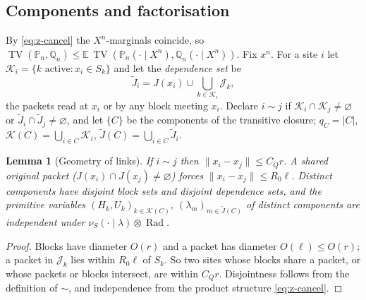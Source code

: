 \documentclass[11pt]{article}
\newtheorem{lemma}[lemma]{Lemma}
\DeclareMathOperator{\Rad}{Rad}
\DeclareMathOperator{\TV}{TV}
\newcommand{\E}{\mathbb{E}}
\newcommand{\PP}{\mathbb{P}}
\newcommand{\cK}{\mathcal{K}}
\newcommand{\cJ}{\mathcal{J}}
\newcommand{\norm}[1]{\lVert #1\rVert}
\newcommand{\abs}[1]{\lvert #1\rvert}
\begin{document}
\subsection{Components and factorisation}
By \eqref{eq:z-cancel} the \(X^n\)-marginals coincide, so
\(\TV(\PP_n,\mathbb Q_n)\le\E\,\TV(\PP_n(\cdot\mid X^n),\mathbb Q_n(\cdot\mid X^n))\).
Fix \(x^n\).  For a site \(i\) let \(\cK_i=\{k\text{ active}:x_i\in S_k\}\)
and let the \emph{dependence set} be
\[
 \widetilde J_i=J(x_i)\cup\bigcup_{k\in\cK_i}\cJ_k ,
\]
the packets read at \(x_i\) or by any block meeting \(x_i\).  Declare
\(i\sim j\) if \(\cK_i\cap\cK_j\ne\varnothing\) or
\(\widetilde J_i\cap\widetilde J_j\ne\varnothing\), and let \(\{C\}\) be
the components of the transitive closure; \(q_C=\abs C\),
\(\cK(C)=\bigcup_{i\in C}\cK_i\), \(\widetilde J(C)=\bigcup_{i\in C}\widetilde J_i\).

\begin{lemma}[Geometry of links]\label{C:lem:links}
If \(i\sim j\) then \(\norm{x_i-x_j}\le C_Qr\).  A shared original packet
(\(J(x_i)\cap J(x_j)\ne\varnothing\)) forces \(\norm{x_i-x_j}\le R_0\ell\).
Distinct components have disjoint block sets and disjoint dependence
sets, and the primitive variables \((H_k,U_k)_{k\in\cK(C)}\),
\((\lambda_m)_{m\in\widetilde J(C)}\) of distinct components are
independent under \(\nu_S(\cdot\mid\lambda)\otimes\Rad\).
\end{lemma}
\begin{proof}
Blocks have diameter \(O(r)\) and a packet has diameter \(O(\ell)\le O(r)\);
a packet in \(\cJ_k\) lies within \(R_0\ell\) of \(S_k\).  So two sites
whose blocks share a packet, or whose packets or blocks intersect, are
within \(C_Qr\).  Disjointness follows from the definition of \(\sim\), and
independence from the product structure \eqref{eq:z-cancel}.
\end{proof}
\end{document}
